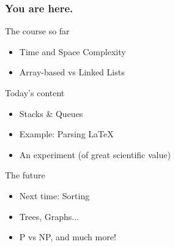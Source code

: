 \begin{frame}
	\frametitle{You are here.}
	\begin{block}{The course so far}
		\begin{itemize}
			\item Time and Space Complexity
			\item Array-based vs Linked Lists
		\end{itemize}
	\end{block}
	\pause
	\begin{exampleblock}{Today's content}
		\begin{itemize}
			\item Stacks \& Queues
			\item Example: Parsing LaTeX
			\item An experiment (of great scientific value)
		\end{itemize}
	\end{exampleblock}
	\pause
	\begin{block}{The future}
		\begin{itemize}
			\item Next time: Sorting
			\item Trees, Graphs...
			\item P vs NP, and much more!
		\end{itemize}
	\end{block}
\end{frame}
